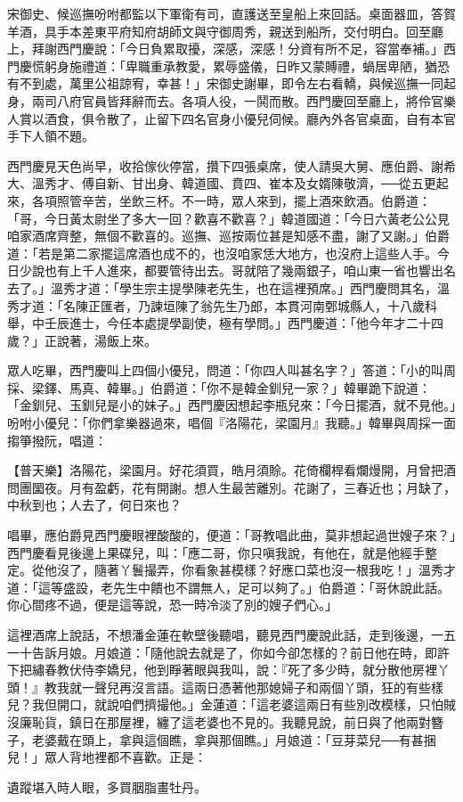 宋御史、候巡撫吩咐都監以下軍衛有司，直護送至皇船上來回話。桌面器皿，答賀羊酒，具手本差東平府知府胡師文與守御周秀，親送到船所，交付明白。回至廳上，拜謝西門慶說：「今日負累取擾，深感，深感！分資有所不足，容當奉補。」西門慶慌躬身施禮道：「卑職重承教愛，累辱盛儀，日昨又蒙賻禮，蝸居卑陋，猶恐有不到處，萬里公祖諒宥，幸甚！」宋御史謝畢，即令左右看轎，與候巡撫一同起身，兩司八府官員皆拜辭而去。各項人役，一鬨而散。西門慶回至廳上，將伶官樂人賞以酒食，俱令散了，止留下四名官身小優兒伺候。廳內外各官桌面，自有本官手下人領不題。

西門慶見天色尚早，收拾傢伙停當，攢下四張桌席，使人請吳大舅、應伯爵、謝希大、溫秀才、傅自新、甘出身、韓道國、賁四、崔本及女婿陳敬濟，──從五更起來，各項照管辛苦，坐飲三杯。不一時，眾人來到，擺上酒來飲酒。伯爵道：「哥，今日黃太尉坐了多大一回？歡喜不歡喜？」韓道國道：「今日六黃老公公見咱家酒席齊整，無個不歡喜的。巡撫、巡按兩位甚是知感不盡，謝了又謝。」伯爵道：「若是第二家擺這席酒也成不的，也沒咱家恁大地方，也沒府上這些人手。今日少說也有上千人進來，都要管待出去。哥就陪了幾兩銀子，咱山東一省也響出名去了。」溫秀才道：「學生宗主提學陳老先生，也在這裡預席。」西門慶問其名，溫秀才道：「名陳正匯者，乃諫垣陳了翁先生乃郎，本貫河南鄄城縣人，十八歲科舉，中壬辰進士，今任本處提學副使，極有學問。」西門慶道：「他今年才二十四歲？」正說著，湯飯上來。

眾人吃畢，西門慶叫上四個小優兒，問道：「你四人叫甚名字？」答道：「小的叫周採、梁鐸、馬真、韓畢。」伯爵道：「你不是韓金釧兒一家？」韓畢跪下說道： 「金釧兒、玉釧兒是小的妹子。」西門慶因想起李瓶兒來：「今日擺酒，就不見他。」吩咐小優兒：「你們拿樂器過來，唱個『洛陽花，梁園月』我聽。」韓畢與周採一面搊箏撥阮，唱道：

【普天樂】洛陽花，梁園月。好花須買，皓月須賒。花倚欄桿看爛熳開，月曾把酒問團圞夜。月有盈虧，花有開謝。想人生最苦離別。花謝了，三春近也；月缺了，中秋到也；人去了，何日來也？

唱畢，應伯爵見西門慶眼裡酸酸的，便道：「哥教唱此曲，莫非想起過世嫂子來？」西門慶看見後邊上果碟兒，叫：「應二哥，你只嗔我說，有他在，就是他經手整定。從他沒了，隨著丫鬟撮弄，你看象甚模樣？好應口菜也沒一根我吃！」溫秀才道：「這等盛設，老先生中饋也不謂無人，足可以夠了。」伯爵道：「哥休說此話。你心間疼不過，便是這等說，恐一時冷淡了別的嫂子們心。」

這裡酒席上說話，不想潘金蓮在軟壁後聽唱，聽見西門慶說此話，走到後邊，一五一十告訴月娘。月娘道：「隨他說去就是了，你如今卻怎樣的？前日他在時，即許下把繡春教伏侍李嬌兒，他到睜著眼與我叫，說：『死了多少時，就分散他房裡丫頭！』教我就一聲兒再沒言語。這兩日憑著他那媳婦子和兩個丫頭，狂的有些樣兒？我但開口，就說咱們擠撮他。」金蓮道：「這老婆這兩日有些別改模樣，只怕賊沒廉恥貨，鎮日在那屋裡，纏了這老婆也不見的。我聽見說，前日與了他兩對簪子，老婆戴在頭上，拿與這個瞧，拿與那個瞧。」月娘道：「豆芽菜兒──有甚捆兒！」眾人背地裡都不喜歡。正是：

遺蹤堪入時人眼，多買胭脂畫牡丹。

